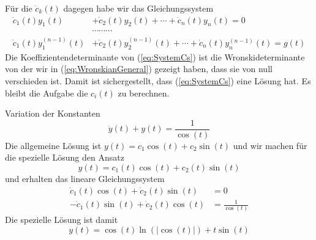 Für die $\dot{c}_k(t)$ dagegen habe wir das Gleichungssystem
\begin{align}
  \dot{c}_1(t)y_1(t)&+\dot{c}_2(t)y_2(t)+\cdots+\dot{c}_n(t)y_n(t)=0\nonumber\\
	       &\cdots\cdots\cdots\nonumber\\
  \dot{c}_1(t)y^{(n-1)}_1(t)&+\dot{c}_2(t)y^{(n-1)}_2(t)+\cdots
  +\dot{c}_n(t)y^{(n-1)}_n(t)=g(t)
	       \label{eq:SystemCs}
\end{align}
Die Koeffizientendeterminante von (\ref{eq:SystemCs}) ist die
Wronskideterminante von der wir in (\ref{eq:WronskianGeneral}) gezeigt haben,
dass sie von null verschieden ist. Damit ist sichergestellt, dass
(\ref{eq:SystemCs}) eine Lösung hat. Es bleibt die Aufgabe die $c_i(t)$ zu berechnen.
%
\begin{example}{Variation der Konstanten}
  \[\ddot{y}(t)+y(t)=\frac{1}{\cos(t)}\]
  Die allgemeine Lösung ist $y(t)=c_1\cos(t)+c_2\sin(t)$ und wir machen für die
  spezielle Lösung den Ansatz
  \[y(t)=c_1(t)\cos(t)+c_2(t)\sin(t)\]
  und erhalten das lineare Gleichungssystem
  \begin{align*}
    \dot{c}_1(t)\cos(t)+\dot{c}_2(t)\sin(t)&=0\\
    -\dot{c}_1(t)\sin(t)+\dot{c}_2(t)\cos(t)&=\frac{1}{\cos(t)}
  \end{align*}
  Die spezielle Lösung ist damit
  \[y(t)=\cos(t)\ln(|\cos(t)|)+t\sin(t)\]
\end{example}
%

